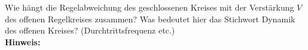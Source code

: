 \begin{question}[section=4,name={Regelabweichung eines geschlossenen Kreises},difficulty=,type=mdl,tags={}]
	Wie hängt die Regelabweichung des geschlossenen Kreises mit der Verstärkung $V$ des offenen Regelkreises zusammen? Was bedeutet hier das Stichwort Dynamik des offenen Kreises? (Durchtrittsfrequenz etc.)
	\\ \textbf{Hinweis:}\\
	
\end{question}
\begin{solution}
	
\end{solution}